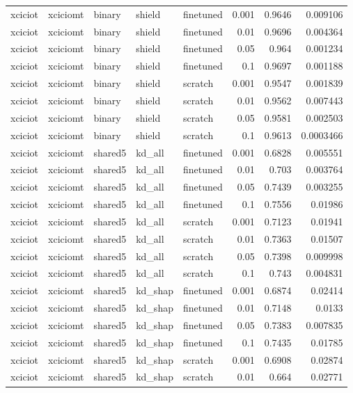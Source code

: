 \begin{table}
\begin{tabular}{lllllrrr}
xciciot & xciciomt & binary & shield & finetuned & 0.001 & 0.9646 & 0.009106 \\
xciciot & xciciomt & binary & shield & finetuned & 0.01 & 0.9696 & 0.004364 \\
xciciot & xciciomt & binary & shield & finetuned & 0.05 & 0.964 & 0.001234 \\
xciciot & xciciomt & binary & shield & finetuned & 0.1 & 0.9697 & 0.001188 \\
xciciot & xciciomt & binary & shield & scratch & 0.001 & 0.9547 & 0.001839 \\
xciciot & xciciomt & binary & shield & scratch & 0.01 & 0.9562 & 0.007443 \\
xciciot & xciciomt & binary & shield & scratch & 0.05 & 0.9581 & 0.002503 \\
xciciot & xciciomt & binary & shield & scratch & 0.1 & 0.9613 & 0.0003466 \\
xciciot & xciciomt & shared5 & kd_all & finetuned & 0.001 & 0.6828 & 0.005551 \\
xciciot & xciciomt & shared5 & kd_all & finetuned & 0.01 & 0.703 & 0.003764 \\
xciciot & xciciomt & shared5 & kd_all & finetuned & 0.05 & 0.7439 & 0.003255 \\
xciciot & xciciomt & shared5 & kd_all & finetuned & 0.1 & 0.7556 & 0.01986 \\
xciciot & xciciomt & shared5 & kd_all & scratch & 0.001 & 0.7123 & 0.01941 \\
xciciot & xciciomt & shared5 & kd_all & scratch & 0.01 & 0.7363 & 0.01507 \\
xciciot & xciciomt & shared5 & kd_all & scratch & 0.05 & 0.7398 & 0.009998 \\
xciciot & xciciomt & shared5 & kd_all & scratch & 0.1 & 0.743 & 0.004831 \\
xciciot & xciciomt & shared5 & kd_shap & finetuned & 0.001 & 0.6874 & 0.02414 \\
xciciot & xciciomt & shared5 & kd_shap & finetuned & 0.01 & 0.7148 & 0.0133 \\
xciciot & xciciomt & shared5 & kd_shap & finetuned & 0.05 & 0.7383 & 0.007835 \\
xciciot & xciciomt & shared5 & kd_shap & finetuned & 0.1 & 0.7435 & 0.01785 \\
xciciot & xciciomt & shared5 & kd_shap & scratch & 0.001 & 0.6908 & 0.02874 \\
xciciot & xciciomt & shared5 & kd_shap & scratch & 0.01 & 0.664 & 0.02771 \\

\end{tabular}
\end{table}
